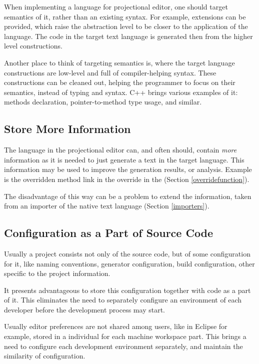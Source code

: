 When implementing a language for projectional editor, one should target semantics of it, rather than an existing syntax.
For example, extensions can be provided, which raise the abstraction level to be closer to the application of the language.
The code in the target text language is generated then from the higher level constructions. 

Another place to think of targeting semantics is, where the target language constructions are low-level and 
full of compiler-helping syntax. These constructions can be cleaned out, helping the programmer to focus on their
semantics, instead of typing and syntax. C++ brings various examples of it:  methods declaration, 
pointer-to-method type usage, and similar.

\subsection{Store More Information}

 The language in the projectional editor can, and often should, contain \emph{more} information as it is needed 
 to just generate a text in the target language. This information may be used to improve the generation results, or
 analysis. Example is the overridden method link in the override in the \pcpp (Section \ref{overridefunction}).
 
 The disadvantage of this way can be a problem to extend the information, taken from an importer of the native text language (Section \ref{importers}).

\subsection{Configuration as a Part of Source Code}
 Usually a project consists not only of the source code, but of some configuration for it, like naming conventions, 
 generator configuration, build configuration, other specific to the project information.
 
 It presents advantageous to store this configuration together with code as a part of it. This eliminates the need 
 to separately configure an environment of each developer before the development process may start.

 Usually editor preferences are not shared among users, like in Eclipse for example, stored in a individual for each 
 machine workspace part. This brings a need to configure each development environment separately, and maintain the similarity
 of configuration.
 
